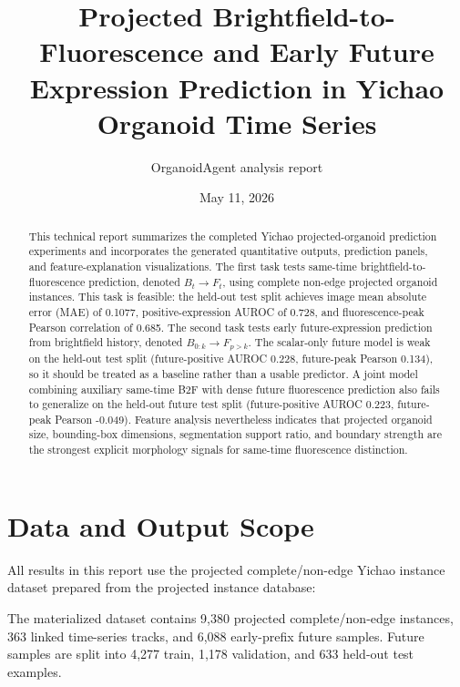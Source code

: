 \documentclass[11pt]{article}
\title{\textbf{Projected Brightfield-to-Fluorescence and Early Future Expression Prediction in Yichao Organoid Time Series}}
\author{OrganoidAgent analysis report}
\date{May 11, 2026}
\begin{document}
\maketitle

\begin{abstract}
This technical report summarizes the completed Yichao projected-organoid prediction experiments and incorporates the generated quantitative outputs, prediction panels, and feature-explanation visualizations. The first task tests same-time brightfield-to-fluorescence prediction, denoted $B_t \rightarrow F_t$, using complete non-edge projected organoid instances. This task is feasible: the held-out test split achieves image mean absolute error (MAE) of 0.1077, positive-expression AUROC of 0.728, and fluorescence-peak Pearson correlation of 0.685. The second task tests early future-expression prediction from brightfield history, denoted $B_{0:k} \rightarrow F_{p>k}$. The scalar-only future model is weak on the held-out test split (future-positive AUROC 0.228, future-peak Pearson 0.134), so it should be treated as a baseline rather than a usable predictor. A joint model combining auxiliary same-time B2F with dense future fluorescence prediction also fails to generalize on the held-out future test split (future-positive AUROC 0.223, future-peak Pearson -0.049). Feature analysis nevertheless indicates that projected organoid size, bounding-box dimensions, segmentation support ratio, and boundary strength are the strongest explicit morphology signals for same-time fluorescence distinction.
\end{abstract}

\section{Data and Output Scope}

All results in this report use the projected complete/non-edge Yichao instance dataset prepared from the projected instance database:

\begin{center}
\small
{}
\end{center}

The materialized dataset contains 9,380 projected complete/non-edge instances, 363 linked time-series tracks, and 6,088 early-prefix future samples. Future samples are split into 4,277 train, 1,178 validation, and 633 held-out test examples.
\end{document}
